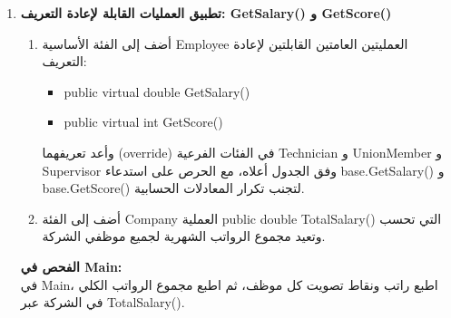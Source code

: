 \documentclass[14pt]{extarticle}
\begin{document}
\begin{enumerate}[label=\textbf{تمرين \arabic*:}, wide=0pt, itemsep=2.2em]

    \item \textbf{تطبيق العمليات القابلة لإعادة التعريف: \textenglish{GetSalary()} و \textenglish{GetScore()}}
    \begin{enumerate}[label=\textbf{(\arabic*)}]
        \item أضف إلى الفئة الأساسية \textenglish{Employee} العمليتين العامتين القابلتين لإعادة التعريف:
        \begin{itemize}
            \item \textenglish{public virtual double GetSalary()}
            \item \textenglish{public virtual int GetScore()}
        \end{itemize}
        وأعد تعريفهما (\textenglish{override}) في الفئات الفرعية \textenglish{Technician} و \textenglish{UnionMember} و \textenglish{Supervisor} وفق الجدول أعلاه، مع الحرص على استدعاء \textenglish{base.GetSalary()} و \textenglish{base.GetScore()} لتجنب تكرار المعادلات الحسابية.
        \item أضف إلى الفئة \textenglish{Company} العملية \textenglish{public double TotalSalary()} التي تحسب وتعيد مجموع الرواتب الشهرية لجميع موظفي الشركة.
    \end{enumerate}
    \textbf{الفحص في \textenglish{Main}:} \\
    في \textenglish{Main}، اطبع راتب ونقاط تصويت كل موظف، ثم اطبع مجموع الرواتب الكلي في الشركة عبر \textenglish{TotalSalary()}.
    \filbreak


\end{enumerate}
\end{document}
